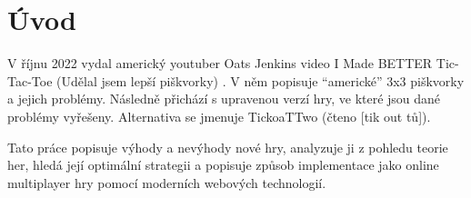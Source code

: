 \makeatletter
\renewcommand{\@chapapp}{}%
\newenvironment{chapquote}[2][2em]
  {\setlength{\@tempdima}{#1}%
   \def\chapquote@author{#2}%
   \parshape 1 \@tempdima \dimexpr\textwidth-2\@tempdima\relax%
   \itshape}
  {\par\normalfont\hfill--\ \chapquote@author\hspace*{\@tempdima}\par\bigskip}
\makeatother

\chapter*{Úvod}

V říjnu 2022 vydal americký youtuber Oats Jenkins video I Made BETTER
Tic-Tac-Toe (Udělal jsem lepší piškvorky) \cite{jenkins22}. V něm popisuje
\enquote{americké} 3x3 piškvorky a jejich problémy. Následně přichází s
upravenou verzí hry, ve které jsou dané problémy vyřešeny. Alternativa se
jmenuje TickoaTTwo (čteno [tik out tů]).

Tato práce popisuje výhody a nevýhody nové hry, analyzuje ji z pohledu teorie
her, hledá její optimální strategii a popisuje způsob implementace jako online
multiplayer hry pomocí moderních webových technologií.
